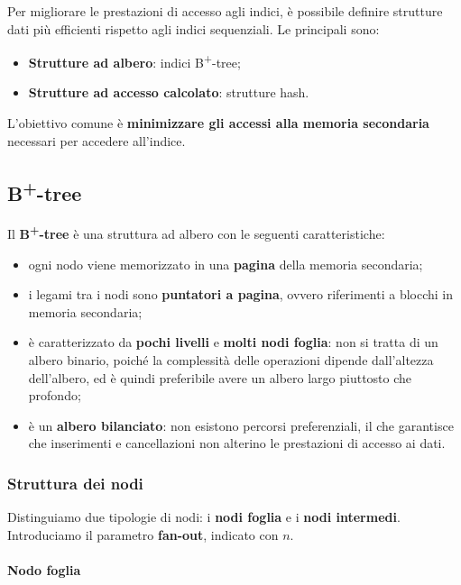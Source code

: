 Per migliorare le prestazioni di accesso agli indici, è possibile definire strutture dati più efficienti rispetto agli indici sequenziali. Le principali sono:

\begin{itemize}
	\item \textbf{Strutture ad albero}: indici B\textsuperscript{+}-tree;
	\item \textbf{Strutture ad accesso calcolato}: strutture hash.
\end{itemize}

L'obiettivo comune è \textbf{minimizzare gli accessi alla memoria secondaria} necessari per accedere all'indice.

\subsection{B\textsuperscript{+}-tree}

Il \textbf{B\textsuperscript{+}-tree} è una struttura ad albero con le seguenti caratteristiche:

\begin{itemize}
	\item ogni nodo viene memorizzato in una \textbf{pagina} della memoria secondaria;
	\item i legami tra i nodi sono \textbf{puntatori a pagina}, ovvero riferimenti a blocchi in memoria secondaria;
	\item è caratterizzato da \textbf{pochi livelli} e \textbf{molti nodi foglia}: non si tratta di un albero binario, poiché la complessità delle operazioni dipende dall'altezza dell'albero, ed è quindi preferibile avere un albero largo piuttosto che profondo;
	\item è un \textbf{albero bilanciato}: non esistono percorsi preferenziali, il che garantisce che inserimenti e cancellazioni non alterino le prestazioni di accesso ai dati.
\end{itemize}

\subsubsection{Struttura dei nodi}

Distinguiamo due tipologie di nodi: i \textbf{nodi foglia} e i \textbf{nodi intermedi}. Introduciamo il parametro \textbf{fan-out}, indicato con $n$.

\paragraph{Nodo foglia}

